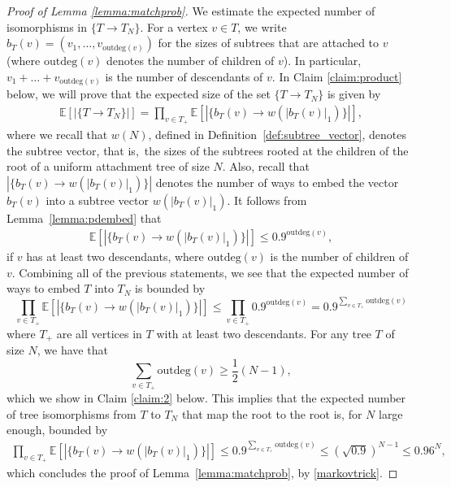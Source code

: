 \documentclass[11pt]{article}
\numberwithin{equation}{section}
\newcommand{\E}{\mathbb{E}} %
\newcommand{\od}{\text{outdeg}}
\theoremstyle{definition}
\begin{document}
\begin{proof}[Proof of Lemma \ref{lemma:matchprob}]
	
	We estimate the expected number of isomorphisms in $\{T \to T_N\}$.  For a vertex $v\in T$, we write $b_T(v)=\left(v_1,\ldots,v_{\od{(v)}}\right)$ for the sizes of subtrees that are attached to $v$ (where $\od{(v)}$ denotes the {number of children} of $v$). In particular, $v_1+\ldots+v_{\od{(v)}}$ is the number of descendants of $v$. In Claim \ref{claim:product} below, we will prove that the expected size of the set $ \{ T \to T_N\}$ is given by
	\begin{align}\label{eq:numembed}
    \E\left[\left| \{ T \to T_N\} \right|\right] =
	\prod_{v\in T_+} \E \left[| \{ b_T(v) \rightarrow w \left(|b_T(v)|_1\right) \}|\right],
	\end{align}
    where we recall that $w(N)$, defined in Definition~\ref{def:subtree_vector}, denotes the subtree vector, that is,\ the sizes of the subtrees rooted at the children of the root of a uniform attachment tree of size $N$. Also, recall that $| \{ b_T(v) \rightarrow w \left(|b_T(v)|_1\right)\}|$ denotes the number of ways to embed the vector $b_T(v)$ into a subtree vector $w(|b_T(v)|_1)$.   It follows from Lemma~\ref{lemma:pdembed} that
	\begin{align*}
	\E \left[|\{ b_T(v) \rightarrow w \left(|b_T(v)|_1\right) \}|\right] 
	\leq  0.9^{\od(v)},
	\end{align*}
	if $v$ has at least two descendants, where $\od(v)$ is the number of children of $v$.  Combining all of the previous statements, we see that the expected number of ways to embed $T$ into $T_N$ is bounded by 
	\begin{equation*}
	\prod_{v\in T_+} \E \left[|\{ b_T(v) \rightarrow w \left(|b_T(v)|_1\right) \}|\right]
	\leq
	\prod_{v\in T_+}0.9^{\od(v)}=0.9^{\sum_{v\in T_+}\od(v)}
	\end{equation*}
	where $T_+$ are all vertices in $T$ with at least two descendants. For any tree $T$ of size $N$, we have that
	\begin{equation*}
	\sum_{v \in T_+} \od (v) \geq \frac12 (N-1),
	\end{equation*}
	which we show in Claim \ref{claim:2} below.
	This implies that the expected number of tree isomorphisms from $T$ to $T_N$ that map the root to the root is, for $N$ large enough, bounded by 
	\begin{align*}
    \prod_{v\in T_+} \E \left[|\{ b_T(v) \rightarrow w \left(|b_T(v)|_1\right) \}|\right]
	\leq 0.9^{\sum_{v\in T_+}\od(v)}
    \leq
	(\sqrt{0.9})^{N-1}\leq 0.96^N,
	\end{align*}
	which concludes the proof of Lemma~\ref{lemma:matchprob}, by \eqref{markovtrick}.
\end{proof}
\end{document}
